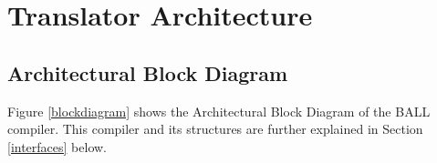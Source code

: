 \documentclass[letterpaper,oneside,12pt, pdftex]{report}
\begin{document}
\pagestyle{empty} %






\tableofcontents %
\cleardoublepage %

\pagestyle{fancy} %

\newcommand{\codelisting}[3]
{
  \begin{singlespace}
  
  \end{singlespace}
}















\label{evolution}

\chapter{Translator Architecture}\label{architecture}

\section{Architectural Block Diagram}
Figure \ref{blockdiagram} shows the Architectural Block Diagram of the
BALL compiler. This compiler and its structures are further explained
in Section \ref{interfaces} below.
\end{document}
